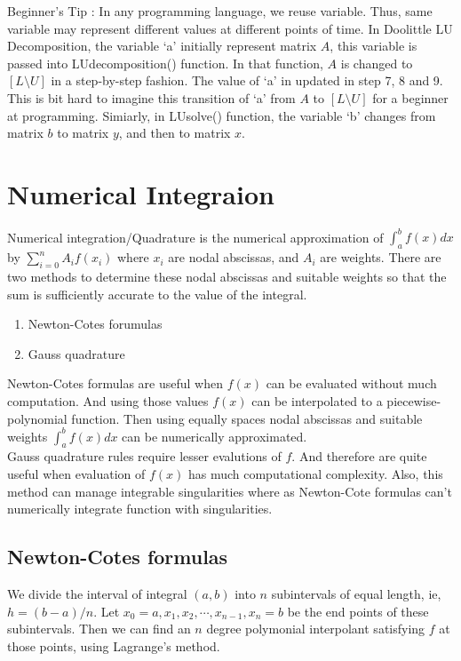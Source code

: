 \begin{commentary}
	Beginner's Tip : In any programming language, we reuse variable.
	Thus, same variable may represent different values at different points of time.
	In Doolittle LU Decomposition, the variable `a' initially represent matrix $A$, this variable is passed into LUdecomposition() function.
	In that function, $A$ is changed to $[L\text{\textbackslash{}}U]$ in a step-by-step fashion.
	The value of `a' in updated in step 7, 8 and 9.
	This is bit hard to imagine this transition of `a' from $A$ to $[L\text{\textbackslash{}}U]$ for a beginner at programming.
	Simiarly, in LUsolve() function, the variable `b' changes from matrix $b$ to matrix $y$, and then to matrix $x$.
\end{commentary}

\section{Numerical Integraion}
	Numerical integration/Quadrature is the numerical approximation of $\int_a^b f(x)dx$ by $\sum_{i=0}^n A_if(x_i)$ where $x_i$ are nodal abscissas, and $A_i$ are weights.
	There are two methods to determine these nodal abscissas and suitable weights so that the sum is sufficiently accurate to the value of the integral.
\begin{enumerate}
	\item Newton-Cotes forumulas
	\item Gauss quadrature
\end{enumerate}

	Newton-Cotes formulas are useful when $f(x)$ can be evaluated without much computation.
	And using those values $f(x)$ can be interpolated to a piecewise-polynomial function.
	Then using equally spaces nodal abscissas and suitable weights $\int_a^b f(x)dx$ can be numerically approximated.\\

	Gauss quadrature rules require lesser evalutions of $f$.
	And therefore are quite useful when evaluation of $f(x)$ has much computational complexity.
	Also, this method can manage integrable singularities where as Newton-Cote formulas can't numerically integrate function with singularities. 

\subsection{Newton-Cotes formulas}
	We divide the interval of integral $(a,b)$ into $n$ subintervals of equal length, ie, $h = (b-a)/n$.
	Let $x_0 = a, x_1, x_2,\cdots,x_{n-1},x_n=b$ be the end points of these subintervals.
	Then we can find an $n$ degree polymonial interpolant satisfying $f$ at those points, using Lagrange's method.\\

